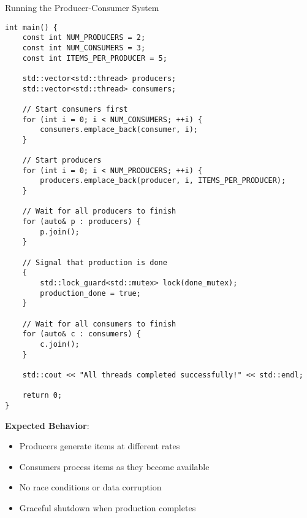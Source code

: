 \begin{frame}[fragile]{ Running the Producer-Consumer System}
	\begin{verbatim}
int main() {
    const int NUM_PRODUCERS = 2;
    const int NUM_CONSUMERS = 3;
    const int ITEMS_PER_PRODUCER = 5;

    std::vector<std::thread> producers;
    std::vector<std::thread> consumers;

    // Start consumers first
    for (int i = 0; i < NUM_CONSUMERS; ++i) {
        consumers.emplace_back(consumer, i);
    }

    // Start producers
    for (int i = 0; i < NUM_PRODUCERS; ++i) {
        producers.emplace_back(producer, i, ITEMS_PER_PRODUCER);
    }

    // Wait for all producers to finish
    for (auto& p : producers) {
        p.join();
    }

    // Signal that production is done
    {
        std::lock_guard<std::mutex> lock(done_mutex);
        production_done = true;
    }

    // Wait for all consumers to finish
    for (auto& c : consumers) {
        c.join();
    }

    std::cout << "All threads completed successfully!" << std::endl;

    return 0;
}
	\end{verbatim}

	\textbf{Expected Behavior}:
	\begin{itemize}
		\item Producers generate items at different rates
		\item Consumers process items as they become available
		\item No race conditions or data corruption
		\item Graceful shutdown when production completes
	\end{itemize}
\end{frame}

